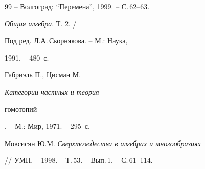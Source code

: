 \begin{thebibliography}{99}
-- Волгоград: ``Перемена'', 1999. -- С.\,62--63.





 {\em Общая алгебра}. Т. 2. / 


Под ред. Л.А.\,Скорнякова. -- М.: Наука,




1991. -- 480~с.





 Габриэль П., Цисман М. {\em Категории частных и теория


гомотопий}. -- М.: Мир, 1971. -- 295~с.





 Мовсисян Ю.М. {\em Сверхтождества в алгебрах и многообразиях}


// УМН. -- 1998. -- Т.\,53. -- Вып.\,1. -- С.\,61--114.





\end{thebibliography}





\vskip 2cm














\label{end}






























